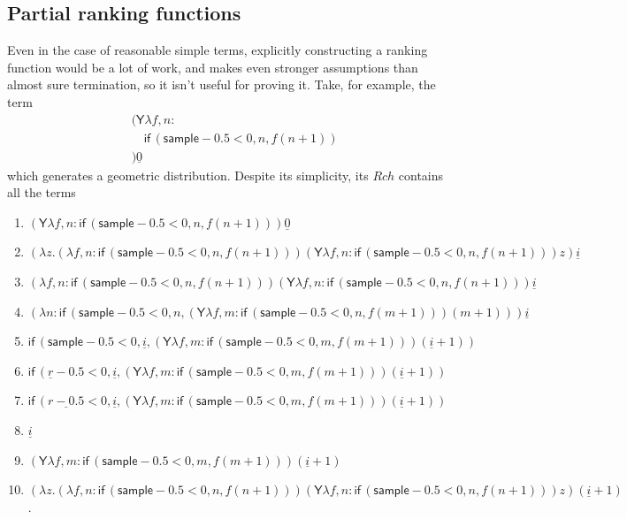 \documentclass{article}
\newcommand{\tY}{\textsf{Y}}
\newcommand{\tif}[3]{\textsf{if}\,(#1, #2, #3)} %
\newcommand{\tsample}{\textsf{sample}}
\theoremstyle{definition}
\theoremstyle{lemma}
\theoremstyle{remark}
\begin{document}
\subsection{Partial ranking functions}
Even in the case of reasonable simple terms, explicitly constructing a ranking function would be a lot of work, and  makes even stronger assumptions than almost sure termination, so it isn't useful for proving it. Take, for example, the term
\begin{align*}
&(\tY \lambda f, n: \\
&\quad \tif{\tsample - 0.5 < 0}{n}{f (n+1)} \\
&) \underline{0}
\end{align*}
which generates a geometric distribution.
    Despite its simplicity, its $Rch$ contains all the terms
\begin{enumerate}
    \item $(\tY \lambda f, n: \tif{\tsample - 0.5 < 0}{n}{f (n+1)}) \underline{0}$
    \item $(\lambda z.(\lambda f, n: \tif{\tsample - 0.5 < 0}{n}{f (n+1)}) (\tY \lambda f, n: \tif{\tsample - 0.5 < 0}{n}{f (n+1)}) z) \underline{i}$
    \item $(\lambda f, n: \tif{\tsample - 0.5 < 0}{n}{f (n+1)}) (\tY \lambda f, n: \tif{\tsample - 0.5 < 0}{n}{f (n+1)}) \underline{i}$
    \item $(\lambda n: \tif{\tsample - 0.5 < 0}{n}{(\tY \lambda f, m: \tif{\tsample - 0.5 < 0}{n}{f (m+1)}) (m+1)}) \underline{i}$
    \item $\tif{\tsample - 0.5 < 0}{\underline{i}}{(\tY \lambda f, m: \tif{\tsample - 0.5 < 0}{m}{f (m+1)}) (\underline{i}+1)}$
    \item $\tif{\underline r - 0.5 < 0}{\underline{i}}{(\tY \lambda f, m: \tif{\tsample - 0.5 < 0}{m}{f (m+1)}) (\underline{i}+1)}$
    \item $\tif{\underline{r - 0.5} < 0}{\underline{i}}{(\tY \lambda f, m: \tif{\tsample - 0.5 < 0}{m}{f (m+1)}) (\underline{i}+1)}$
    \item $\underline{i}$
    \item $(\tY \lambda f, m: \tif{\tsample - 0.5 < 0}{m}{f (m+1)}) (\underline{i}+1)$
    \item $(\lambda z.(\lambda f, n: \tif{\tsample - 0.5 < 0}{n}{f (n+1)}) (\tY \lambda f, n: \tif{\tsample - 0.5 < 0}{n}{f (n+1)}) z) (\underline{i} + 1)$.
\end{enumerate}
\end{document}
